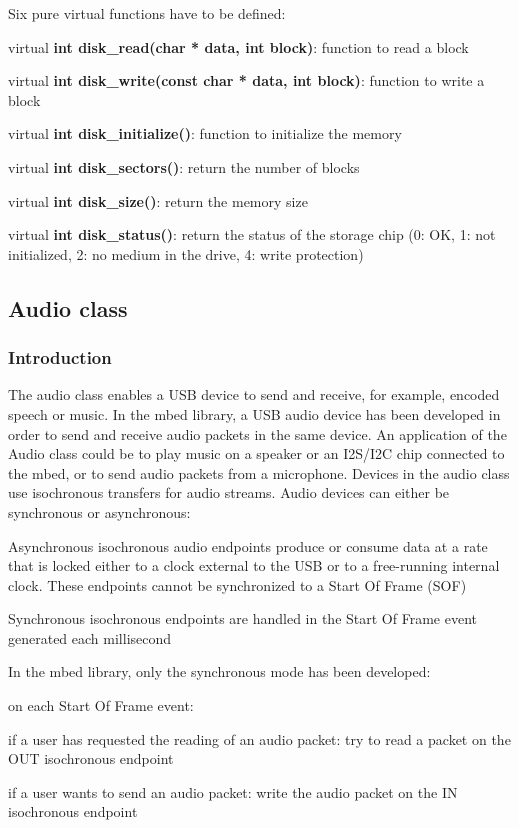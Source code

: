 \documentclass[pdftex,10pt,a4paper]{report}
\newenvironment{packed_item}{
\begin{itemize}
  \setlength{\itemsep}{1pt}
  \setlength{\parskip}{0pt}
  \setlength{\parsep}{0pt}
}{\end{itemize}}
\begin{document}
Six pure virtual functions have to be defined:
\begin{packed_item}
	\item virtual \textbf{int disk\_read(char * data, int block)}: function to read a block
	\item virtual \textbf{int disk\_write(const char * data, int block)}: function to write a block
	\item virtual \textbf{int disk\_initialize()}: function to initialize the memory
	\item virtual \textbf{int disk\_sectors()}: return the number of blocks
	\item virtual \textbf{int disk\_size()}: return the memory size
	\item virtual \textbf{int disk\_status()}: return the status of the storage chip (0: OK, 1: not initialized, 2: no medium in the drive, 4: write protection)
\end{packed_item}


\subsection{Audio class}
\subsubsection{Introduction}
The audio class enables a USB device to send and receive, for example, encoded speech or music. In the mbed library, a USB audio device has been developed in order to send and receive audio packets in the same device. An application of the Audio class could be to play music on a speaker or an I2S/I2C chip connected to the mbed, or to send audio packets from a microphone. Devices in the audio class use isochronous transfers for audio streams. Audio devices can either be synchronous or asynchronous:
\begin{packed_item}
	\item Asynchronous isochronous audio endpoints produce or consume data at a rate that is locked either to a
clock external to the USB or to a free-running internal clock. These endpoints cannot be synchronized to a Start Of Frame (SOF)
	\item Synchronous isochronous endpoints are handled in the Start Of Frame event generated each millisecond
\end{packed_item}
In the mbed library, only the synchronous mode has been developed:
\begin{packed_item}
	\item on each Start Of Frame event:
	\begin{packed_item}
		\item if a user has requested the reading of an audio packet: try to read a packet on the OUT isochronous endpoint
		\item if a user wants to send an audio packet: write the audio packet on the IN isochronous endpoint
	\end{packed_item}
\end{packed_item}
\end{document}
